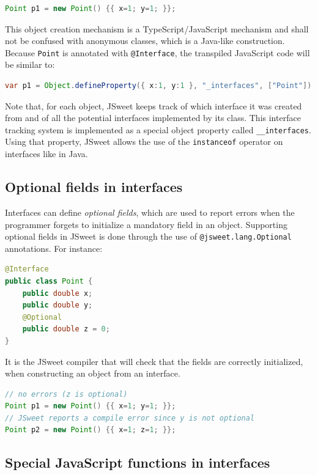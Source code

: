 \documentclass[a4paper]{report}
\begin{document}
\begin{lstlisting}[language=Java]
Point p1 = new Point() {{ x=1; y=1; }};
\end{lstlisting}

This object creation mechanism is a TypeScript/JavaScript mechanism and shall not be confused with anonymous classes, which is a Java-like construction. Because \texttt{Point} is annotated with \texttt{@Interface}, the transpiled JavaScript code will be similar to:

\begin{lstlisting}[language=Java]
var p1 = Object.defineProperty({ x:1, y:1 }, "_interfaces", ["Point"]);
\end{lstlisting}

Note that, for each object, JSweet keeps track of which interface it was created from and of all the potential interfaces implemented by its class. This interface tracking system is implemented as a special object property called \texttt{\_\_interfaces}. Using that property, JSweet allows the use of the \texttt{instanceof} operator on interfaces like in Java.

\subsection{Optional fields in interfaces}
 
Interfaces can define \emph{optional fields}, which are used to report errors when the programmer forgets to initialize a mandatory field in an object. Supporting optional fields in JSweet is done through the use of \texttt{@jsweet.lang.Optional} annotations. For instance:

\begin{lstlisting}[language=Java]
@Interface
public class Point {
	public double x;
	public double y;
	@Optional
	public double z = 0;
}
\end{lstlisting}

It is the JSweet compiler that will check that the fields are correctly initialized, when constructing an object from an interface.

\begin{lstlisting}[language=Java]
// no errors (z is optional)
Point p1 = new Point() {{ x=1; y=1; }};
// JSweet reports a compile error since y is not optional
Point p2 = new Point() {{ x=1; z=1; }};
\end{lstlisting}

\subsection{Special JavaScript functions in interfaces}
\end{document}
